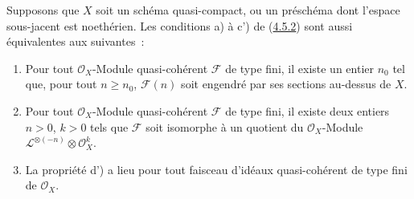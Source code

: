 \begin{proposition}[4.5.5]
\label{II.4.5.5-fr}
Supposons que $X$ soit un schéma quasi-compact, ou un préschéma dont l'espace
sous-jacent est noethérien. Les conditions a) à c') de
(\hyperref[II.4.5.2-fr]{4.5.2}) sont aussi équivalentes aux suivantes~:
\begin{enumerate}
  \item[\rm{d)}] Pour tout $\mathcal{O}_X$-Module quasi-cohérent
  $\mathcal{F}$ de type fini, il existe un entier $n_0$ tel que, pour tout
  $n\geq n_0$, $\mathcal{F}(n)$ soit engendré par ses sections au-dessus de
  $X$.
  \item[\rm{d')}] Pour tout $\mathcal{O}_X$-Module quasi-cohérent
  $\mathcal{F}$ de type fini, il existe deux entiers $n>0$, $k>0$ tels que
  $\mathcal{F}$ soit isomorphe à un quotient du $\mathcal{O}_X$-Module
  $\mathcal{L}^{\otimes(-n)}\otimes\mathcal{O}_X^k$.
  \item[\rm{d'')}] La propriété d') a lieu pour tout faisceau d'idéaux
  quasi-cohérent de type fini de $\mathcal{O}_X$.
\end{enumerate}
\end{proposition}

